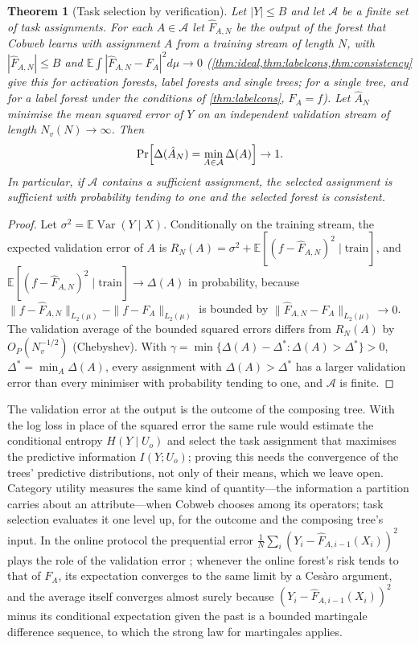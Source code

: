 \documentclass[11pt]{article}
\newtheorem{theorem}{Theorem}
\theoremstyle{definition}
\theoremstyle{remark}
\newcommand{\E}{\mathbb{E}}
\newcommand{\cA}{\mathcal{A}}
\newcommand{\Var}{\operatorname{Var}}
\begin{document}
\begin{theorem}[Task selection by verification]\label{thm:selection}
Let $|Y|\le B$ and let $\cA$ be a finite set of task assignments.  For each $A\in\cA$ let
$\hat F_{A,N}$ be
the output of the forest that Cobweb learns with assignment $A$ from a training stream
of length $N$, with $|\hat F_{A,N}|\le B$ and $\E\int|\hat F_{A,N}-F_A|^2d\mu\to0$
(\cref{thm:ideal,thm:labelcons,thm:consistency} give this for activation forests, label
forests and single trees; for a single tree, and for a label forest under the conditions
of \cref{thm:labelcons}, $F_A=f$).  Let $\hat A_N$ minimise the mean squared error of $Y$ on an
independent validation stream of length $N_v(N)\to\infty$.  Then
\[
  \Pr\Bigl[\Delta(\hat A_N)=\min_{A\in\cA}\Delta(A)\Bigr]\to1.
\]
In particular, if $\cA$ contains a sufficient assignment, the selected assignment is
sufficient with probability tending to one and the selected forest is consistent.
\end{theorem}
\begin{proof}
Let $\sigma^2=\E\Var(Y\mid X)$.  Conditionally on the training stream, the expected
validation error of $A$ is
$R_N(A)=\sigma^2+\E[(f-\hat F_{A,N})^2\mid\text{train}]$, and
$\E[(f-\hat F_{A,N})^2\mid\text{train}]\to\Delta(A)$ in probability, because
$\|f-\hat F_{A,N}\|_{L_2(\mu)}-\|f-F_A\|_{L_2(\mu)}$ is bounded by
$\|\hat F_{A,N}-F_A\|_{L_2(\mu)}\to0$.  The validation average of the bounded squared
errors differs from $R_N(A)$ by $O_P(N_v^{-1/2})$ (Chebyshev).  With
$\gamma=\min\{\Delta(A)-\Delta^*:\Delta(A)>\Delta^*\}>0$, $\Delta^*=\min_A\Delta(A)$,
every assignment with $\Delta(A)>\Delta^*$ has a larger validation error than every
minimiser with probability tending to one, and $\cA$ is finite.
\end{proof}

The validation error at the output is the outcome of the composing tree.  With the log
loss in place of the squared error the same rule would estimate the conditional entropy
$H(Y\mid U_o)$ and select the task assignment that maximises the predictive information
$I(Y;U_o)$; proving this needs the convergence of the trees' predictive distributions,
not only of their means, which we leave open.  Category utility measures the same kind of
quantity---the information a partition carries about an attribute---when Cobweb chooses
among its operators; task selection evaluates it one level up, for the outcome and the
composing tree's input.  In
the online protocol the prequential error $\frac1N\sum_i(Y_i-\hat F_{A,i-1}(X_i))^2$
plays the role of the validation error \citep{dawid1984}; whenever the online forest's risk tends to that of $F_A$, its expectation converges to
the same limit by a Ces\`aro argument, and the average itself converges almost surely
because $(Y_i-\hat F_{A,i-1}(X_i))^2$ minus its conditional expectation given the past is a
bounded martingale difference sequence, to which the strong law for martingales applies.
\end{document}
